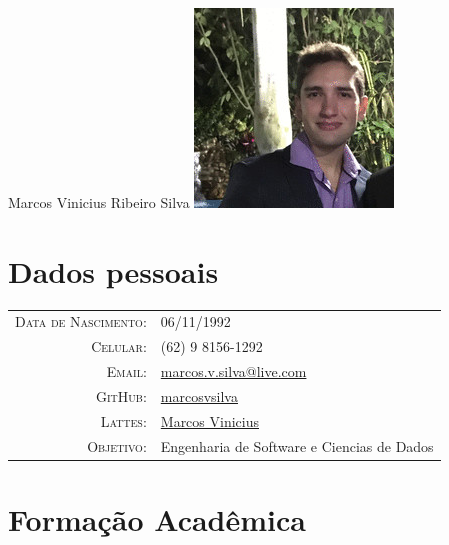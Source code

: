 \documentclass[12pt, oneside, openany, a4paper, english, brazil]{abntex2}
\begin{document}
\pagestyle{empty} 


\par{
	\raggedright{\Huge Marcos Vinicius Ribeiro Silva   }
	\raggedleft\includegraphics[scale=0.3]{Pictures/Me}
\par}

\section{Dados pessoais}

\begin{tabular}{rl}
	\textsc{Data de Nascimento:} & 06/11/1992\\
	\textsc{Celular:} & (62) 9 8156-1292\\
	\textsc{Email:} & \href{mailto:marcos.v.silva@live.com}{marcos.v.silva@live.com} \\
	\textsc{GitHub:} & \href{https://github.com/marcosvsilva}{marcosvsilva} \\
	\textsc{Lattes:} & \href{ http://lattes.cnpq.br/6930019751033452}{Marcos Vinicius} \\
	\textsc{Objetivo:} & Engenharia de Software e Ciencias de Dados \\
\end{tabular}


\section{Formação Acadêmica}
\end{document}
